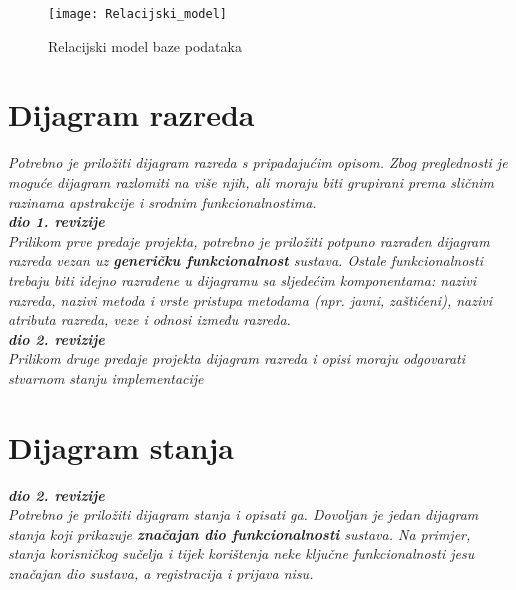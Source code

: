 			\begin{figure}[h]
				\texttt{[image: Relacijski\_model]}
				\caption{Relacijski model baze podataka}
			\end{figure}
			
			\eject

			
			
		\section{Dijagram razreda}
		
			\textit{Potrebno je priložiti dijagram razreda s pripadajućim opisom. Zbog preglednosti je moguće dijagram razlomiti na više njih, ali moraju biti grupirani prema sličnim razinama apstrakcije i srodnim funkcionalnostima.}\\
			
			\textbf{\textit{dio 1. revizije}}\\
			
			\textit{Prilikom prve predaje projekta, potrebno je priložiti potpuno razrađen dijagram razreda vezan uz \textbf{generičku funkcionalnost} sustava. Ostale funkcionalnosti trebaju biti idejno razrađene u dijagramu sa sljedećim komponentama: nazivi razreda, nazivi metoda i vrste pristupa metodama (npr. javni, zaštićeni), nazivi atributa razreda, veze i odnosi između razreda.}\\
			
			\textbf{\textit{dio 2. revizije}}\\			
			
			\textit{Prilikom druge predaje projekta dijagram razreda i opisi moraju odgovarati stvarnom stanju implementacije}
			
			
			
			\eject
		
		\section{Dijagram stanja}
			
			
			\textbf{\textit{dio 2. revizije}}\\
			
			\textit{Potrebno je priložiti dijagram stanja i opisati ga. Dovoljan je jedan dijagram stanja koji prikazuje \textbf{značajan dio funkcionalnosti} sustava. Na primjer, stanja korisničkog sučelja i tijek korištenja neke ključne funkcionalnosti jesu značajan dio sustava, a registracija i prijava nisu. }
			
			
			\eject 
		

